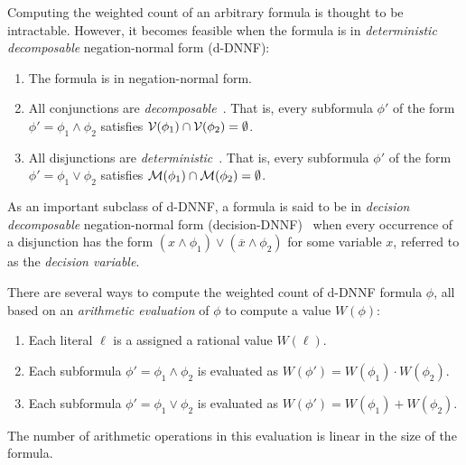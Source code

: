 \documentclass[
hf
]{ceurart}
\newcommand{\obar}[1]{\overline{#1}}
\newcommand{\lit}{\ell}
\newcommand{\dependencyset}{{\cal V}}
\newcommand{\modelset}{{\cal M}}
\begin{document}
Computing the weighted count of an arbitrary formula is thought to be intractable.  However, it becomes
feasible when the formula is in \emph{deterministic decomposable} negation-normal form (d-DNNF):
\begin{enumerate}
\item The formula is in negation-normal form.  
\item All conjunctions are \emph{decomposable}~\cite{darwiche:jacm:2001,darwiche:jair:2002}.  That is, every subformula $\phi'$ of the form $\phi' = \phi_1 \land \phi_2$
  satisfies $\dependencyset(\phi_1) \cap \dependencyset(\phi_2) = \emptyset$.
\item All disjunctions are \emph{deterministic}~\cite{darwiche:jair:2002,darwiche:jancl:2001}.  That is, every subformula $\phi'$ of the form $\phi' =\phi_1 \lor \phi_2$ satisfies
  $\modelset(\phi_1) \cap \modelset(\phi_2) = \emptyset$.
\end{enumerate}
As an important subclass of d-DNNF, a formula is said to be in 
\emph{decision decomposable} negation-normal form (decision-DNNF)~\cite{huang:jair:2007} when every occurrence of a disjunction has the form 
$(x \land \phi_1) \lor (\obar{x} \land \phi_2)$ for some variable $x$, referred to as the \emph{decision variable}.

There are several ways to compute the weighted count of d-DNNF formula $\phi$, all
based on an \emph{arithmetic evaluation} of $\phi$ to compute a value $W(\phi)$:
\begin{enumerate}
\item Each literal $\lit$ is a assigned a rational value $W(\lit)$.
\item Each subformula $\phi' = \phi_1 \land \phi_2$ is evaluated as $W(\phi') = W(\phi_1) \cdot W(\phi_2)$.
\item Each subformula $\phi' = \phi_1 \lor \phi_2$ is evaluated as $W(\phi') = W(\phi_1) + W(\phi_2)$.
\end{enumerate}
The number of arithmetic operations in this evaluation is linear in the size of the formula.
\end{document}
